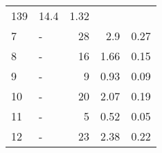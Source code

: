 \begin{longtable}{lXrrr}
       \num{139} &
       \num[round-mode=places,round-precision=2]{14,4} &
         \num[round-mode=places,round-precision=2]{1,32} \\

     7 &
     \multicolumn{1}{X}{ -  } &


       \num{28} &
       \num[round-mode=places,round-precision=2]{2,9} &
         \num[round-mode=places,round-precision=2]{0,27} \\

     8 &
     \multicolumn{1}{X}{ -  } &


       \num{16} &
       \num[round-mode=places,round-precision=2]{1,66} &
         \num[round-mode=places,round-precision=2]{0,15} \\

     9 &
     \multicolumn{1}{X}{ -  } &


       \num{9} &
       \num[round-mode=places,round-precision=2]{0,93} &
         \num[round-mode=places,round-precision=2]{0,09} \\

     10 &
     \multicolumn{1}{X}{ -  } &


       \num{20} &
       \num[round-mode=places,round-precision=2]{2,07} &
         \num[round-mode=places,round-precision=2]{0,19} \\

     11 &
     \multicolumn{1}{X}{ -  } &


       \num{5} &
       \num[round-mode=places,round-precision=2]{0,52} &
         \num[round-mode=places,round-precision=2]{0,05} \\

     12 &
     \multicolumn{1}{X}{ -  } &


       \num{23} &
       \num[round-mode=places,round-precision=2]{2,38} &
         \num[round-mode=places,round-precision=2]{0,22} \\


\end{longtable}
